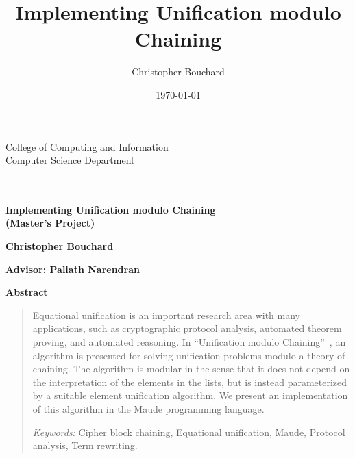 \documentclass[11pt]{article}
\title{Implementing Unification modulo Chaining}
\author{Christopher Bouchard}
\date{\today}
\begin{document}
\begin{titlepage}
    {\vspace*{-1in}\hspace*{-.5in}
    \parbox{7.25in}{
    \setlength{\baselineskip}{13pt}
    \makebox{\ } \hfill {\footnotesize College of Computing and Information} \\
    \makebox{\ } \hfill {\footnotesize Computer Science Department} \\
    \makebox{\ } \\
    \\
    }
    \vspace{-.95in}}

    \epsfxsize=3.15in
    \epsfclipon

    \vspace*{2in}

    \begin{center}
        \textbf{\huge Implementing Unification modulo Chaining} \\[+15pt]
        \textbf{(Master's Project)}
        \par
    \end{center}

    \vspace{2in}

    \begin{center}
    \textbf{\large Christopher Bouchard}\\

    \par\end{center}{\large \par}

    \begin{center}
    \textbf{\large \vspace{0.5in}
    Advisor: Paliath Narendran }\textbf{ }
    \par\end{center}
\end{titlepage}

\begin{center}
    \textbf{Abstract}
\end{center}
\begin{quotation}
Equational unification is an important research area with many applications,
such as cryptographic protocol analysis, automated theorem proving, and
automated reasoning. In ``Unification modulo
Chaining''~\cite{anantharaman2012unification}, an algorithm is presented for
solving unification problems modulo a theory of chaining. The algorithm is
modular in the sense that it does not depend on the interpretation of the
elements in the lists, but is instead parameterized by a suitable element
unification algorithm. We present an implementation of this algorithm in the
Maude programming language.

\medskip{}
\textit{Keywords:} Cipher block chaining, Equational unification, Maude, Protocol
analysis, Term rewriting.
\end{quotation}
\end{document}
